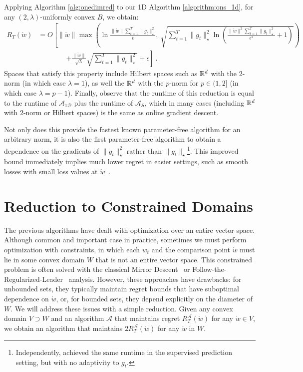\documentclass[12pt]{colt2018} %
\newcommand{\ol}{\mathcal{A}}
\newcommand{\bol}{\mathcal{A}_{S}}
\newcommand{\onedol}{\mathcal{A_{\text{1D}}}}
\newcommand{\w}{\mathring{w}}
\begin{document}
Applying Algorithm \ref{alg:onedimred} to our 1D Algorithm \ref{algorithm:ons_1d}, for any $(2,\lambda)$-uniformly convex $B$, we obtain:
\begin{align*}
R_T(\w)&=O\left[\|\w\|\max\left(\ln\frac{\|\w\|\sum_{t=1}^T \|g_t\|_\star^2}{\epsilon},\ \sqrt{\sum_{t=1}^T \|g_t\|_\star ^2\ln\left(\frac{\|\w\|^2\sum_{t=1}^T \|g_t\|_\star^2}{\epsilon^2}+1\right)}\right)\right.\\
&\quad\quad\quad\quad\left. + \frac{\|\w\|}{\sqrt{\lambda}}\sqrt{\sum_{t=1}^T \|g_t\|_\star^2} + \epsilon\right]~.
\end{align*}
Spaces that satisfy this property include Hilbert spaces such as $\mathbb{R}^d$ with the $2$-norm (in which case $\lambda=1$), as well the $\mathbb{R}^d$ with the $p$-norm for $p\in (1,2]$ (in which case $\lambda=p-1$). Finally, observe that the runtime of this reduction is equal to the runtime of $\onedol$ plus the runtime of $\bol$, which in many cases (including $\mathbb{R}^d$ with $2$-norm or Hilbert spaces) is the same as online gradient descent.

Not only does this provide the fastest known parameter-free algorithm for an arbitrary norm, it is also the first parameter-free algorithm to obtain a dependence on the gradients of $\|g_t\|_\star^2$ rather than $\|g_t\|_\star$\footnote{Independently, \citep{foster2018online} achieved the same runtime in the supervised prediction setting, but with no adaptivity to $g_t$.}. This improved bound immediately implies much lower regret in easier settings, such as smooth losses with small loss values at $\w$~\citep{srebro2010smoothness}.


\section{Reduction to Constrained Domains}\label{sec:constrained}

The previous algorithms have dealt with optimization over an entire vector space. Although common and important case in practice, sometimes we must perform optimization with constraints, in which each $w_t$ and the comparison point $\w$ must lie in some convex domain $W$ that is not an entire vector space. This constrained problem is often solved with the classical Mirror Descent~\cite{zinkevich2003online} or Follow-the-Regularized-Leader~\cite{shalev2007online} analysis. 
However, these approaches have drawbacks: for unbounded sets, they typically maintain regret bounds that have suboptimal dependence on $\w$, or, for bounded sets, they depend explicitly on the diameter of $W$. We will address these issues with a simple reduction.
Given any convex domain $V\supset W$ and an algorithm $\ol$ that maintains regret $R^{\ol}_T(\w)$ for any $\w\in V$, we obtain an algorithm that maintains $2R^{\ol}_T(\w)$ for any $\w$ in $W$.
\end{document}
